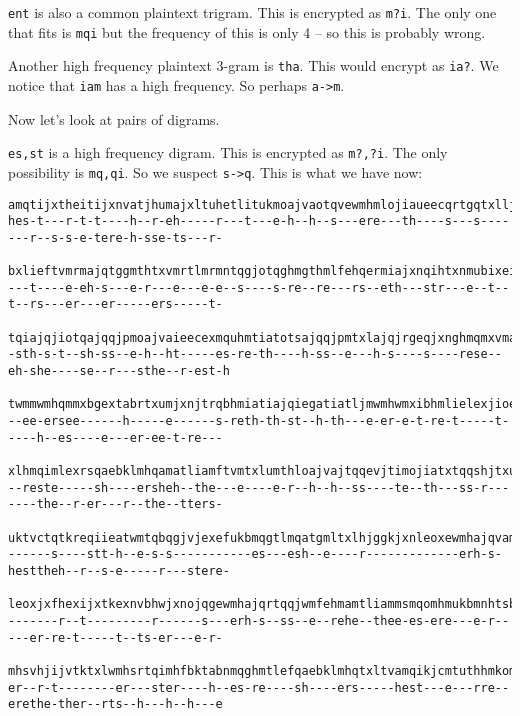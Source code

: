 \verb!ent! is also a common plaintext trigram.
This is encrypted as \verb!m?i!.
The only one that fits is \verb!mqi! but the frequency of this is only 4 -- so this is probably wrong.

Another high frequency plaintext 3-gram is \verb!tha!.
This would encrypt as \verb!ia?!.
We notice that \verb!iam! has a high frequency.
So perhaps \verb!a->m!.

Now let's look at pairs of digrams.

\verb!es,st! is a high frequency digram.
This is encrypted as \verb!m?,?i!.
The only possibility is \verb!mq,qi!.
So we suspect \verb!s->q!.
This is what we have now:
  \begin{Verbatim}[frame=single,fontsize=\tiny]
amqtijxtheitijxnvatjhumajxltuhetlitukmoajvaotqvewmhmlojiaueecqrtgqtxlljtnhtrqtqjmximhmlajqqmtiqgbxhe
hes-t---r-t-t----h--r-eh-----r---t---e-h--h--s---ere---th----s---s-------r--s-s-e-tere-h-sse-ts---r-

bxlieftvmrmajqtggmthtxvmrtlmrmntqgjotqghmgthmlfehqermiajxnqihtxnmubixeifehqeewmhgeomhjxntgmhqextkjis
---t----e-eh-s---e-r---e---e-e--s----s-re--re---rs--eth---str---e--t--t--rs---er---er-----ers-----t-

tqiajqjiotqajqqjpmoajvaieecexmquhmtiatotsajqqjpmtxlajqjrgeqjxnghmqmxvmajqamtlotqmxehrebqiamkthnmqija
-sth-s-t--sh-ss--e-h--ht-----es-re-th----h-ss--e---h-s----s----rese--eh-she----se--r---sthe--r-est-h

twmmwmhqmmxbgextabrtxumjxnjtrqbhmiatiajqiegatiatljmwmhwmxibhmlielexjioebklatwmqkjggmlewmhrmmxijhmkst
--ee-ersee------h-----e------s-reth-th-st--h-th---e-er-e-t-re-t-----t-----h--es----e---er-ee-t-re---

xlhmqimlexrsqaebklmhqamatliamftvmtxlumthloajvajtqqevjtimojiatxtqqshjtxubkkiamfehrmhfkehjliamktiimhqe
--reste-----sh----ersheh--the---e----e-r--h--h--ss----te--th---ss-r-------the--r-er---r--the--tters-

uktvctqtkreqiieatwmtqbqgjvjexefukbmqgtlmqatgmltxlhjggkjxnleoxewmhajqvamqiiamatjhotqgmvbkjthgktqimhml
------s----stt-h--e-s-s-----------es---esh--e----r-------------erh-s-hesttheh--r--s-e-----r---stere-

leoxjxfhexijxtkexnvbhwjxnojqgewmhajqrtqqjwmfehmamtliammsmqomhmukbmnhtsbxlmhnhmtiuktvcibfiqwmhsvkmthw
-------r--t---------r------s---erh-s--ss--e--rehe--thee-es-ere---e-r-----er-re-t-----t--ts-er---e-r-

mhsvhjijvtktxlwmhsrtqimhfbktabnmqghmtlefqaebklmhqtxltvamqikjcmtuthhmkomhmiameiamhgthiqefajroajvatggm
er--r-t--------er---ster----h--es-re----sh----ers-----hest---e---rre--erethe-ther--rts--h---h--h---e


\end{Verbatim}
